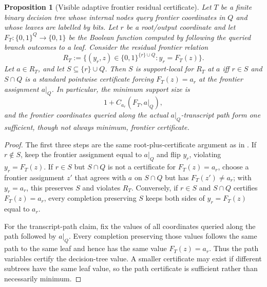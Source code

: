 \documentclass[11pt]{article}
\newtheorem{proposition}[theorem]{Proposition}
\theoremstyle{definition}
\newcommand{\bits}{\{0,1\}}
\begin{document}
\begin{proposition}[Visible adaptive frontier residual certificate]\label{prop:visible-adaptive-frontier-residual}
Let \(T\) be a finite binary decision tree whose internal nodes query frontier coordinates in \(Q\) and whose leaves are labelled by bits.  Let \(r\) be a root/output coordinate and let \(F_T:\bits^Q\to\bits\) be the Boolean function computed by following the queried branch outcomes to a leaf.  Consider the residual frontier relation
\[
  R_T
  :=
  \{(y_r,z)\in\bits^{\{r\}\cup Q}: y_r=F_T(z)\}.
\]
Let \(a\in R_T\), and let \(S\subseteq\{r\}\cup Q\).  Then \(S\) is support-local for \(R_T\) at \(a\) iff \(r\in S\) and \(S\cap Q\) is a standard pointwise certificate forcing \(F_T(z)=a_r\) at the frontier assignment \(a|_Q\).  In particular, the minimum support size is
\[
  1+C_{a_r}(F_T,a|_Q),
\]
and the frontier coordinates queried along the actual \(a|_Q\)-transcript path form one sufficient, though not always minimum, frontier certificate.
\end{proposition}

\begin{proof}
The first three steps are the same root-plus-certificate argument as in .  If \(r\notin S\), keep the frontier assignment equal to \(a|_Q\) and flip \(y_r\), violating \(y_r=F_T(z)\).  If \(r\in S\) but \(S\cap Q\) is not a certificate for \(F_T(z)=a_r\), choose a frontier assignment \(z'\) that agrees with \(a\) on \(S\cap Q\) but has \(F_T(z')\ne a_r\); with \(y_r=a_r\), this preserves \(S\) and violates \(R_T\).  Conversely, if \(r\in S\) and \(S\cap Q\) certifies \(F_T(z)=a_r\), every completion preserving \(S\) keeps both sides of \(y_r=F_T(z)\) equal to \(a_r\).

For the transcript-path claim, fix the values of all coordinates queried along the path followed by \(a|_Q\).  Every completion preserving those values follows the same path to the same leaf and hence has the same value \(F_T(z)=a_r\).  Thus the path variables certify the decision-tree value.  A smaller certificate may exist if different subtrees have the same leaf value, so the path certificate is sufficient rather than necessarily minimum.
\end{proof}
\end{document}
